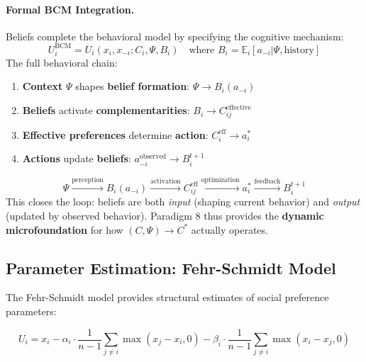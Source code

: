 \paragraph{Formal BCM Integration.}
Beliefs complete the behavioral model by specifying the cognitive mechanism:
\begin{equation}
\boxed{
U_i^{\text{BCM}} = U_i(x_i, x_{-i}; C_i, \Psi, B_i) \quad \text{where }
B_i = \mathbb{E}_i[a_{-i} | \Psi, \text{history}]
}
\tag{EV-BCM-BELIEF}
\end{equation}
The full behavioral chain:
\begin{enumerate}[nosep]
    \item \textbf{Context} $\Psi$ shapes \textbf{belief formation}: $\Psi \to B_i(a_{-i})$
    \item \textbf{Beliefs} activate \textbf{complementarities}: $B_i \to C_{ij}^{\text{effective}}$
    \item \textbf{Effective preferences} determine \textbf{action}: $C_i^{\text{eff}} \to a_i^*$
    \item \textbf{Actions} update \textbf{beliefs}: $a_{-i}^{\text{observed}} \to B_i^{t+1}$
\end{enumerate}
\begin{equation}
\Psi \xrightarrow{\text{perception}} B_i(a_{-i}) \xrightarrow{\text{activation}}
C_{ij}^{\text{eff}} \xrightarrow{\text{optimization}} a_i^* \xrightarrow{\text{feedback}} B_i^{t+1}
\tag{EV-CHAIN}
\end{equation}
This closes the loop: beliefs are both \emph{input} (shaping current behavior) and
\emph{output} (updated by observed behavior). Paradigm 8 thus provides the
\textbf{dynamic microfoundation} for how $(C, \Psi) \to C^*$ actually operates.


\subsection{Parameter Estimation: Fehr-Schmidt Model}
\label{sec:EV-parameters}

The Fehr-Schmidt model \citep{fehrschmidt} provides structural estimates of
social preference parameters:

\begin{equation}
U_i = x_i - \alpha_i \cdot \frac{1}{n-1} \sum_{j \neq i} \max(x_j - x_i, 0)
     - \beta_i \cdot \frac{1}{n-1} \sum_{j \neq i} \max(x_i - x_j, 0)
\label{eq:EV-fehrschmidt}
\end{equation}

